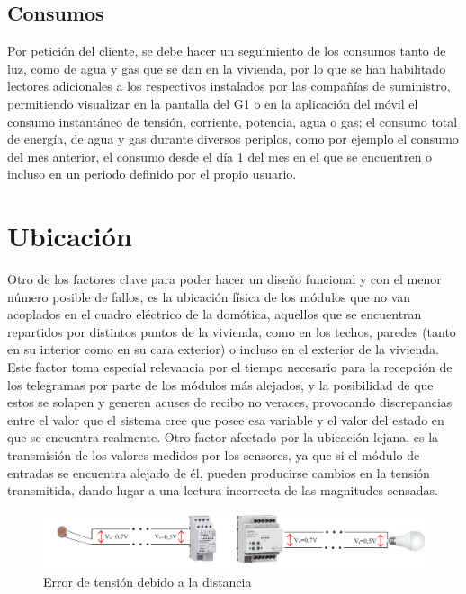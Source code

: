\subsection{Consumos} Por petición del cliente, se debe hacer un seguimiento de los consumos tanto de luz, como de agua y gas que se dan en la vivienda, por lo que se han habilitado lectores adicionales a los respectivos instalados por las compañías de suministro, permitiendo visualizar en la pantalla del G1 o en la aplicación del móvil el consumo instantáneo de tensión, corriente, potencia, agua o gas; el consumo total de energía, de agua y gas durante diversos periplos, como por ejemplo el consumo del mes anterior, el consumo desde el día 1 del mes en el que se encuentren o incluso en un periodo definido por el propio usuario.

\section{Ubicación}

Otro de los factores clave para poder hacer un diseño funcional y con el menor número posible de fallos, es la ubicación física de los módulos que no van acoplados en el cuadro eléctrico de la domótica, aquellos que se encuentran repartidos por distintos puntos de la vivienda, como en los techos, paredes (tanto en su interior como en su cara exterior) o incluso en el exterior de la vivienda. Este factor toma especial relevancia por el tiempo necesario para la recepción de los telegramas por parte de los módulos más alejados, y la posibilidad de que estos se solapen y generen acuses de recibo no veraces, provocando discrepancias entre el valor que el sistema cree que posee esa variable y el valor del estado en que se encuentra realmente. Otro factor afectado por la ubicación lejana, es la transmisión de los valores medidos por los sensores, ya que si el módulo de entradas se encuentra alejado de él, pueden producirse cambios en la tensión transmitida, dando lugar a una lectura incorrecta de las magnitudes sensadas.
\begin{figure}[H]
\begin{center}
\includegraphics[width=1.15\textwidth]{figures/caida_tension.png}   
\caption{Error de tensión debido a la distancia}
\label{fig:caida_tension}
\end{center}
\end{figure}

